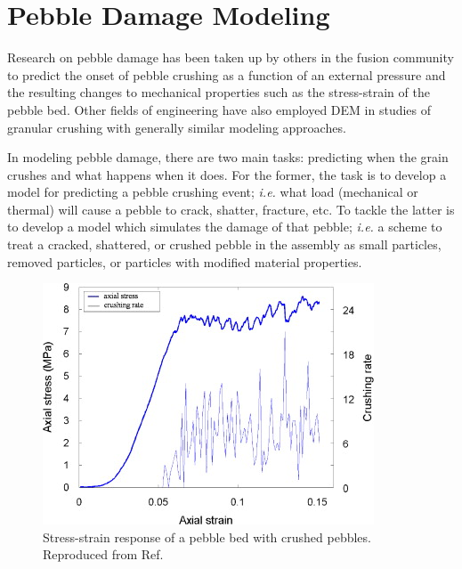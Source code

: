 \section{Pebble Damage Modeling}\label{sec:failure-study}
Research on pebble damage has been taken up by others in the fusion community to predict the onset of pebble crushing as a function of an external pressure and the resulting changes to mechanical properties such as the stress-strain of the pebble bed.\cite{Annabattula2012a, Zhao2012, Zhao2013} Other fields of engineering have also employed DEM in studies of granular crushing with generally similar modeling approaches.\cite{Marketos2007,Pitchumani2004}


In modeling pebble damage, there are two main tasks: predicting when the grain crushes and what happens when it does. For the former, the task is to develop a model for predicting a pebble crushing event; \textit{i.e.} what load (mechanical or thermal) will cause a pebble to crack, shatter, fracture, etc. To tackle the latter is to develop a model which simulates the damage of that pebble; \textit{i.e.} a scheme to treat a cracked, shattered, or crushed pebble in the assembly as small particles, removed particles, or particles with modified material properties.

\begin{figure}[!t]
\centering
	\includegraphics[width=\singleimagewidth]{chapters/figures/markets-bolton-stress-strain-crushing.jpg}
	\caption{Stress-strain response of a pebble bed with crushed pebbles. Reproduced from Ref.~\cite{Marketos2007}}
	\label{fig:marketos-bolton-stress-strain}
\end{figure}

